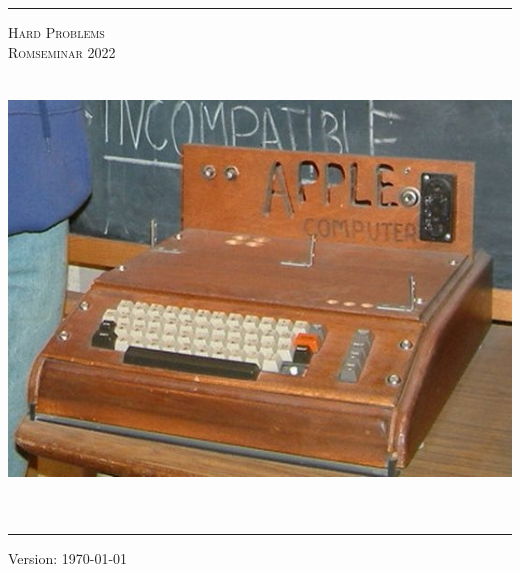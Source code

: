 \begin{titlepage}
	\newcommand{\HRule}{\rule{\linewidth}{.25mm}}
	\HRule
	\vspace*{10pt}
	\begin{center}
	  {\Huge\scshape Hard Problems \\[5mm]
				Romseminar 2022 \\ }
	\vspace*{15pt}
	\includegraphics[width=14cm, height=12cm, keepaspectratio=true]{./content/gruppenbild}
	\vspace*{10pt}	  
	\end{center}
	\HRule
	\begin{center}
	  {Version: \today }
	\end{center}
\end{titlepage}

